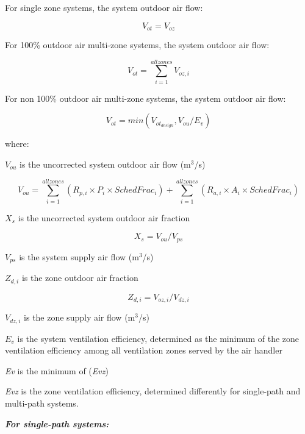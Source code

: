 For single zone systems, the system outdoor air flow:

\begin{equation}
{V_{ot}} = {V_{oz}}
\end{equation}

For 100\% outdoor air multi-zone systems, the system outdoor air flow:

\begin{equation}
{V_{ot}} = \mathop \sum \limits_{i = 1}^{allzones} {V_{oz,i}}
\end{equation}

For non 100\% outdoor air multi-zone systems, the system outdoor air flow:

\begin{equation}
{V_{ot}} = min(V_{{ot}_{design}}, {V_{ou}}/{E_v})
\end{equation}

where:

\({V_{ou}}\) is the uncorrected system outdoor air flow (m\(^3\)/s)

\begin{equation}
{V_{ou}} = \mathop \sum \limits_{i = 1}^{allzones} ({R_{p,i}} \times {P_i} \times {SchedFrac_i}) + \mathop \sum \limits_{i = 1}^{allzones} ({R_{a,i}} \times {A_i} \times {SchedFrac_i})
\end{equation}

\({X_s}\) is the uncorrected system outdoor air fraction

\begin{equation}
{X_s} = {V_{ou}}/{V_{ps}}
\end{equation}

\({V_{ps}}\) is the system supply air flow (m\(^3\)/s)

\({Z_{d,i}}\) is the zone outdoor air fraction

\begin{equation}
{Z_{d,i}} = {V_{oz,i}}/{V_{dz,i}}
\end{equation}

\({V_{dz,i}}\) is the zone supply air flow (m\(^3\)/s)

\({E_v}\) is the system ventilation efficiency, determined as the minimum of the zone ventilation efficiency among all ventilation zones served by the air handler

\emph{Ev} is the minimum of (\emph{Evz})

\emph{Evz} is the zone ventilation efficiency, determined differently for single-path and multi-path systems.

\textbf{\emph{For single-path systems:}}

